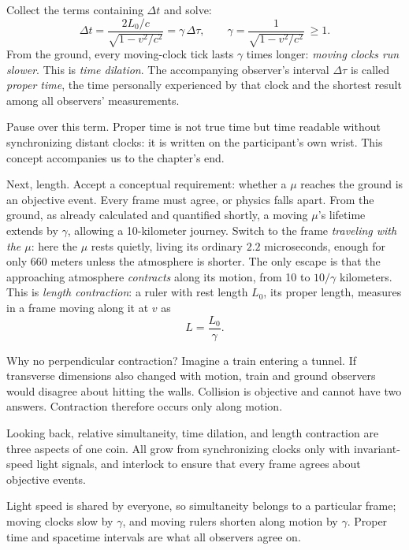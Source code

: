 \begin{mainline}
Collect the terms containing \(\Delta t\) and solve:
\[
\Delta t=\frac{2L_0/c}{\sqrt{1-v^{2}/c^{2}}}=\gamma\,\Delta\tau,
\qquad
\gamma=\frac{1}{\sqrt{1-v^{2}/c^{2}}}\ \ge 1.
\]
From the ground, every moving-clock tick lasts \(\gamma\) times longer: \emph{moving clocks run slower}. This is \emph{time dilation}. The accompanying observer's interval \(\Delta\tau\) is called \emph{proper time}, the time personally experienced by that clock and the shortest result among all observers' measurements.

Pause over this term. Proper time is not true time but time readable without synchronizing distant clocks: it is written on the participant's own wrist. This concept accompanies us to the chapter's end.

Next, length. Accept a conceptual requirement: whether a \(\mu\) reaches the ground is an objective event. Every frame must agree, or physics falls apart. From the ground, as already calculated and quantified shortly, a moving \(\mu\)'s lifetime extends by \(\gamma\), allowing a 10-kilometer journey. Switch to the frame \emph{traveling with the \(\mu\)}: here the \(\mu\) rests quietly, living its ordinary \(2.2\) microseconds, enough for only 660 meters unless the atmosphere is shorter. The only escape is that the approaching atmosphere \emph{contracts} along its motion, from 10 to \(10/\gamma\) kilometers. This is \emph{length contraction}: a ruler with rest length \(L_0\), its proper length, measures in a frame moving along it at \(v\) as
\[
L=\frac{L_0}{\gamma}.
\]

Why no perpendicular contraction? Imagine a train entering a tunnel. If transverse dimensions also changed with motion, train and ground observers would disagree about hitting the walls. Collision is objective and cannot have two answers. Contraction therefore occurs only along motion.

Looking back, relative simultaneity, time dilation, and length contraction are three aspects of one coin. All grow from synchronizing clocks only with invariant-speed light signals, and interlock to ensure that every frame agrees about objective events.
\end{mainline}


\begin{oneline}
Light speed is shared by everyone, so simultaneity belongs to a particular frame; moving clocks slow by \(\gamma\), and moving rulers shorten along motion by \(\gamma\). Proper time and spacetime intervals are what all observers agree on.
\end{oneline}

